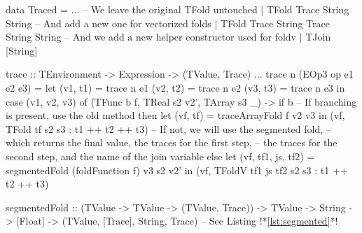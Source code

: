         \begin{haskell}[caption=Data parallel fold tracing, label=lst:trace_foldv, gobble=12]
            data Traced
                = $\dots$
                -- We leave the original TFold untouched
                | TFold Trace String String
                -- And add a new one for vectorized folds
                | TFold Trace String Trace  String String
                -- And we add a new helper constructor used for foldv
                | TJoin [String]

            trace :: TEnvironment -> Expression -> (TValue, Trace)
            $\dots$
            trace n (EOp3 op e1 e2 e3) = 
                let (v1, t1) = trace n e1
                    (v2, t2) = trace n e2
                    (v3, t3) = trace n e3
                in  case (v1, v2, v3) of
                    (TFunc b f, TReal s2 v2', TArray s3 _) ->
                        if   b  
                             -- If branching is present, use the old method
                        then let (vf, tf) = traceArrayFold f v2 v3
                             in  (vf, TFold tf s2 s3 : t1 ++ t2 ++ t3)
                             -- If not, we will use the segmented fold,
                             -- which returns the final value, the traces for the first step,
                             -- the traces for the second step, and the name of the join variable
                        else let (vf, tf1, js, tf2) =
                                    segmentedFold (foldFunction f) v3 s2 v2'
                             in (vf, TFoldV tf1 js tf2 s2 s3 : t1 ++ t2 ++ t3)

            segmentedFold :: (TValue -> TValue -> (TValue, Trace))
                -> TValue -> String -> [Float]
                -> (TValue, [Trace], String, Trace)
            -- See Listing !*\ref{lst:segmented}*!
        \end{haskell}

